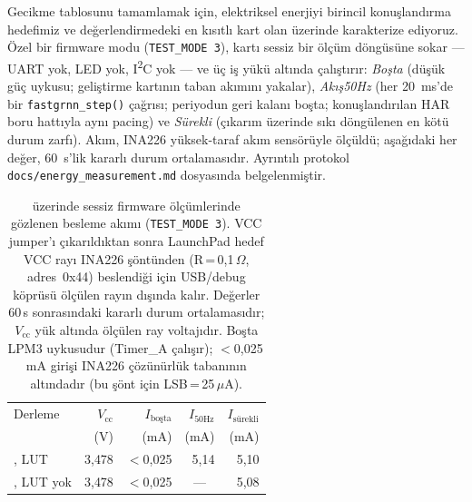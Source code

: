 Gecikme tablosunu tamamlamak için, elektriksel enerjiyi birincil
konuşlandırma hedefimiz ve değerlendirmedeki en kısıtlı kart olan
\msp{} üzerinde karakterize ediyoruz. Özel bir firmware modu
(\texttt{TEST\_MODE 3}), kartı sessiz bir ölçüm döngüsüne sokar ---
UART yok, LED yok, I\textsuperscript{2}C yok --- ve üç iş yükü
altında çalıştırır: \textit{Boşta} (düşük güç uykusu; geliştirme
kartının taban akımını yakalar), \textit{Akış50Hz} (her 20~ms'de bir
\texttt{fastgrnn\_step()} çağrısı; periyodun geri kalanı boşta;
konuşlandırılan HAR boru hattıyla aynı pacing) ve \textit{Sürekli}
(çıkarım üzerinde sıkı döngülenen en kötü durum zarfı). Akım, INA226
yüksek-taraf akım sensörüyle ölçüldü; aşağıdaki her değer, 60~s'lik
kararlı durum ortalamasıdır. Ayrıntılı protokol
\texttt{docs/energy\_measurement.md} dosyasında belgelenmiştir.

\begin{table}[t]
\centering
\caption{\msp{} üzerinde sessiz firmware ölçümlerinde gözlenen besleme
akımı (\texttt{TEST\_MODE~3}). VCC jumper'ı çıkarıldıktan sonra
LaunchPad hedef VCC rayı INA226 şöntünden (R\,=\,0{,}1\,$\Omega$,
adres~0x44) beslendiği için USB/debug köprüsü ölçülen rayın dışında
kalır. Değerler 60\,s sonrasındaki kararlı durum ortalamasıdır;
$V_{\text{cc}}$ yük altında ölçülen ray voltajıdır. Boşta LPM3
uykusudur (Timer\_A çalışır); $<$0{,}025\,mA girişi INA226 çözünürlük
tabanının altındadır (bu şönt için LSB\,=\,25\,$\mu$A).}
\label{tab:energy}
\begin{tabular}{lrrrr}
\toprule
Derleme & $V_{\text{cc}}$ & $I_{\text{boşta}}$ & $I_{50\text{Hz}}$ & $I_{\text{sürekli}}$ \\
        & (V)             & (mA)               & (mA)              & (mA) \\
\midrule
\msp{}, LUT    & 3{,}478 & $<$0{,}025 & 5{,}14 & 5{,}10 \\
\msp{}, LUT yok & 3{,}478 & $<$0{,}025 & \multicolumn{1}{c}{---} & 5{,}08 \\
\bottomrule
\end{tabular}
\end{table}

